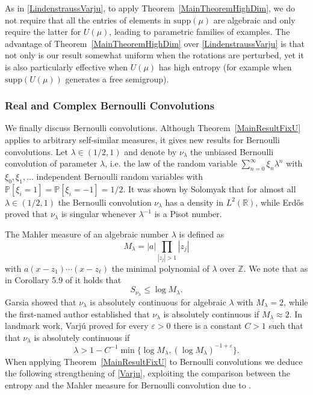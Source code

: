 \documentclass[10pt, english,oneside,reqno]{amsart}
\theoremstyle{plain}
\theoremstyle{remark}
\numberwithin{equation}{section}
\numberwithin{figure}{section}
\newcommand{\eps}{\varepsilon}
\newcommand{\Z}{\mathbb{Z}}
\newcommand{\R}{\mathbb{R}}
\begin{document}
    As in \eqref{LindenstraussVarju}, to apply Theorem~\ref{MainTheoremHighDim}, we do not require that all the entries of elements in $\mathrm{supp}(\mu)$ are algebraic and only require the latter for $U(\mu)$, leading to parametric families of examples. The advantage of Theorem~\ref{MainTheoremHighDim} over \eqref{LindenstraussVarju} is that not only is our result somewhat uniform when the rotations are perturbed, yet it is also particularly effective when $U(\mu)$ has high entropy (for example when $\mathrm{supp}(U(\mu))$ generates a free semigroup).

    \subsubsection*{\normalfont\textbf{Real and Complex Bernoulli Convolutions}} We finally discuss Bernoulli convolutions. Although Theorem~\ref{MainResultFixU} applies to arbitrary self-similar measures, it gives new results for Bernoulli convolutions. Let $\lambda \in (1/2,1)$ and denote by $\nu_{\lambda}$ the unbiased Bernoulli convolution of parameter $\lambda$, i.e. the law of the random variable $\sum_{n = 0}^{\infty} \xi_n\lambda^n$ with $\xi_0,\xi_1, \ldots$ independent Bernoulli random variables with $\mathbb{P}[\xi_i = 1] = \mathbb{P}[\xi_i = -1] =  1/2$. It was shown by Solomyak \cite{Solomyak1995} that for almost all $\lambda \in (1/2,1)$ the Bernoulli convolution $\nu_{\lambda}$ has a density in $L^2(\R)$, while Erd\H{o}s \cite{Erdos1939} proved that $\nu_{\lambda}$ is singular whenever $\lambda^{-1}$ is a Pisot number.

    The Mahler measure of an algebraic number $\lambda$ is defined as $$M_{\lambda} = |a|\prod_{|z_j| > 1} |z_j|$$ with $a(x-z_1)\cdots(x-z_{\ell})$ the minimal polynomial of $\lambda$ over $\Z$. We note that as in Corollary 5.9 of \cite{Kittle2023} it holds that 
    \begin{equation}\label{SeparationMahlerBound}
        S_{\nu_{\lambda}} \leq \log M_{\lambda}.
    \end{equation}
    Garsia \cite[Theorem 1.8]{Garsia1962} showed that $\nu_{\lambda}$ is absolutely continuous for algebraic $\lambda$ with $M_{\lambda} = 2$, while the first-named author \cite{Kittle2021} established that $\nu_{\lambda}$ is absolutely continuous if $M_{\lambda} \approx 2$. In landmark work, Varjú \cite{Varju2019} proved for every $\eps > 0$ there is a constant $C>1$ such that that $\nu_{\lambda}$ is absolutely continuous if 
    \begin{equation}\label{Varju}
        \lambda > 1 - C^{-1}\min\{\log M_{\lambda},(\log M_{\lambda})^{-1 + \eps} \}.
    \end{equation}
    When applying Theorem~\ref{MainResultFixU} to Bernoulli convolutions we deduce the following strengthening of \eqref{Varju}, exploiting the comparison between the entropy and the Mahler measure for Bernoulli convolution due to \cite{BreuillardVarju2020}.
\end{document}
